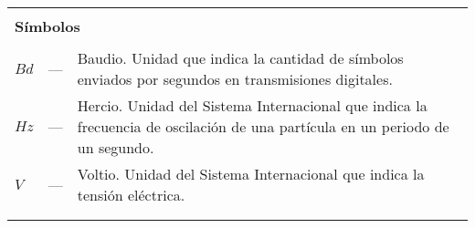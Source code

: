 \begin{longtable}{lcp{} }
\\
\\

\multicolumn{3}{l}{\textbf{Símbolos}}\\
\\
$Bd$ & --- & Baudio. Unidad que indica la cantidad de símbolos enviados por segundos en transmisiones digitales.\\

$Hz$ & --- & Hercio. Unidad del Sistema Internacional que indica la frecuencia de oscilación de una partícula en un periodo de un segundo.\\

$V$ & --- & Voltio. Unidad del Sistema Internacional que indica la tensión eléctrica.\\

\\
\\

\end{longtable}